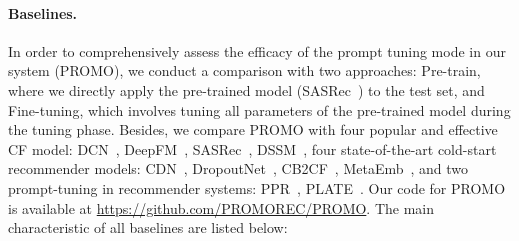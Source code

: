 \documentclass[sigconf]{acmart}
\newcommand{\sys}{\textsc{PROMO}\xspace}
\begin{document}
\paragraph{Baselines.}
In order to comprehensively assess the efficacy of the prompt tuning mode in our system (\sys), we conduct a comparison with two approaches: Pre-train, where we directly apply the pre-trained model (SASRec~\cite{kang2018self}) to the test set, and Fine-tuning, which involves tuning all parameters of the pre-trained model during the tuning phase.
Besides, we compare \sys with four popular and effective CF model: DCN~\cite{wang2017deep}, DeepFM~\cite{guo2017deepfm}, SASRec~\cite{kang2018self}, DSSM~\cite{huang2013learning}, four state-of-the-art cold-start recommender models: CDN~\cite{zhang2023empowering}, DropoutNet~\cite{volkovs2017dropoutnet}, CB2CF~\cite{barkan2019cb2cf}, MetaEmb~\cite{pan2019warm}, and two prompt-tuning in recommender systems: PPR~\cite{wu2024personalized}, PLATE~\cite{wang2023plate}. 
Our code for \sys is available at \url{https://github.com/PROMOREC/PROMO}. 
The main characteristic of all baselines are listed below:
\end{document}
